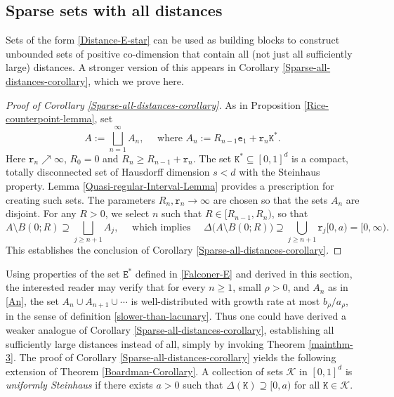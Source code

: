 \documentclass[a4paper,11pt]{amsart}
\numberwithin{equation}{section}
\begin{document}
\subsection{Sparse sets with all distances}  \label{Sparse-set-all-distances-proof-section} Sets of the form \eqref{Distance-E-star} can be used as building blocks to construct unbounded sets of positive co-dimension that contain all (not just all sufficiently large) distances. A stronger version of this appears in  Corollary \ref{Sparse-all-distances-corollary}, which we prove here. 
\begin{proof}[Proof of Corollary \ref{Sparse-all-distances-corollary}]
As in Proposition \ref{Rice-counterpoint-lemma}, set
\begin{equation} A := \bigsqcup_{n=1}^{\infty} A_n, \quad \text{ where } A_n := R_{n-1} \mathtt e_1 + \mathtt r_n \mathtt K^{\ast}.  \label{An}  \end{equation} 
Here $\mathtt r_n \nearrow \infty$, $R_0=  0$ and $R_n \geq R_{n-1} + \mathtt r_n$. The set $\mathtt K^{\ast} \subseteq [0,1]^{d}$ is a compact, totally disconnected set of Hausdorff dimension $s < d$ with the Steinhaus property. Lemma \ref{Quasi-regular-Interval-Lemma} provides a prescription for creating such sets. The parameters $R_n, \mathtt r_n \rightarrow \infty$ are chosen so that the sets $A_n$ are disjoint. For any $R > 0$, we select $n$ such that $R \in [R_{n-1}, R_n)$, so that 
\[ A \setminus B(0;R) \supseteq \bigsqcup_{j \geq n+1} A_j, \quad \text{ which implies } \quad \Delta \bigl(A \setminus B(0;R) \bigr) \supseteq \bigcup_{j \geq n+1} \mathtt r_j [0, a) = [0, \infty). \] 
This establishes the conclusion of Corollary \ref{Sparse-all-distances-corollary}. 
\end{proof}
\noindent Using properties of the set $\mathtt E^{\ast}$ defined in \eqref{Falconer-E} and derived in this section, the interested reader may verify that for every $n \geq 1$, small $\rho > 0$, and $A_n$ as in \eqref{An}, the set $A_n \cup A_{n+1} \cup \cdots $ is well-distributed with growth rate at most $b_{\rho}/a_{\rho}$, in the sense of definition \ref{slower-than-lacunary}. Thus one could have derived a weaker analogue of Corollary \ref{Sparse-all-distances-corollary}, establishing all sufficiently large distances instead of all, simply by invoking Theorem \ref{mainthm-3}. 
\vskip0.1in
\noindent  The proof of Corollary \ref{Sparse-all-distances-corollary} yields the following extension of Theorem \ref{Boardman-Corollary}.  A collection of sets $\mathscr{K}$ in $[0,1]^d$ is {\em{uniformly Steinhaus}} if there exists $a > 0$ such that $\Delta(\mathtt K) \supseteq [0, a)$ for all $\mathtt K \in \mathscr{K}$. 
\end{document}
